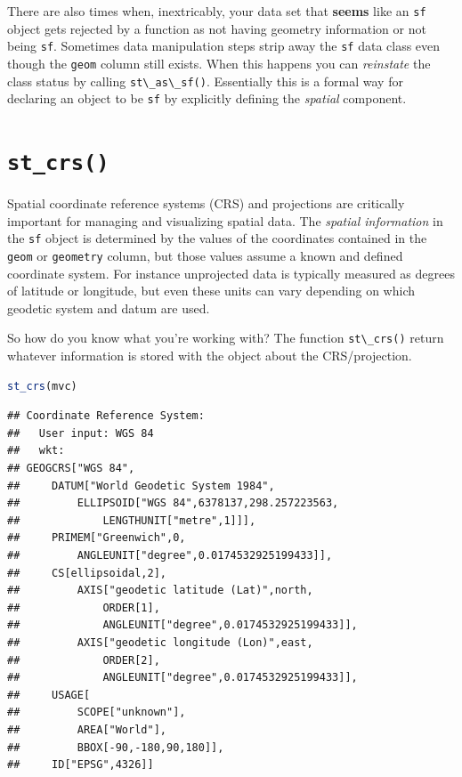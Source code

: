 \documentclass[
]{book}
\newcommand{\passthrough}[1]{#1}
\begin{document}
There are also times when, inextricably, your data set that \textbf{seems} like an \passthrough{\lstinline!sf!} object gets rejected by a function as not having geometry information or not being \passthrough{\lstinline!sf!}. Sometimes data manipulation steps strip away the \passthrough{\lstinline!sf!} data class even though the \passthrough{\lstinline!geom!} column still exists. When this happens you can \emph{reinstate} the class status by calling \passthrough{\lstinline!st\_as\_sf()!}. Essentially this is a formal way for declaring an object to be \passthrough{\lstinline!sf!} by explicitly defining the \emph{spatial} component.

\hypertarget{st_crs}{%
\section{\texorpdfstring{\texttt{st\_crs()}}{st\_crs()}}\label{st_crs}}

Spatial coordinate reference systems (CRS) and projections are critically important for managing and visualizing spatial data. The \emph{spatial information} in the \passthrough{\lstinline!sf!} object is determined by the values of the coordinates contained in the \passthrough{\lstinline!geom!} or \passthrough{\lstinline!geometry!} column, but those values assume a known and defined coordinate system. For instance unprojected data is typically measured as degrees of latitude or longitude, but even these units can vary depending on which geodetic system and datum are used.

So how do you know what you're working with? The function \passthrough{\lstinline!st\_crs()!} return whatever information is stored with the object about the CRS/projection.

\begin{lstlisting}[language=R]
st_crs(mvc)
\end{lstlisting}

\begin{lstlisting}
## Coordinate Reference System:
##   User input: WGS 84 
##   wkt:
## GEOGCRS["WGS 84",
##     DATUM["World Geodetic System 1984",
##         ELLIPSOID["WGS 84",6378137,298.257223563,
##             LENGTHUNIT["metre",1]]],
##     PRIMEM["Greenwich",0,
##         ANGLEUNIT["degree",0.0174532925199433]],
##     CS[ellipsoidal,2],
##         AXIS["geodetic latitude (Lat)",north,
##             ORDER[1],
##             ANGLEUNIT["degree",0.0174532925199433]],
##         AXIS["geodetic longitude (Lon)",east,
##             ORDER[2],
##             ANGLEUNIT["degree",0.0174532925199433]],
##     USAGE[
##         SCOPE["unknown"],
##         AREA["World"],
##         BBOX[-90,-180,90,180]],
##     ID["EPSG",4326]]
\end{lstlisting}
\end{document}
